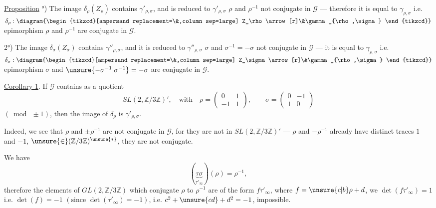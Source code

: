 
\uline{Proposition} °) The image $\delta_\rho(Z_\rho)$ contains
$\gamma'_{\rho,\sigma}$, and is
reduced to $\gamma'_{\rho,\sigma}$ 
$\rho$ and $\rho^{-1}$ not conjugate in $\mathcal{G}$ ---
therefore it is equal to $\gamma_{\rho,\sigma}$
i.e.
$\delta_\rho:\diagram{\begin{tikzcd}[ampersand replacement=\&,column sep=large]
Z_\rho\arrow[r]\&\gamma_{\rho,\sigma}
\end{tikzcd}}$
epimorphism  $\rho$ and $\rho^{-1}$ are conjugate in $\mathcal{G}$.

2°) The image $\delta_\sigma(Z_\sigma)$ contains
$\gamma''_{\rho,\sigma}$, and it is reduced to
$\gamma''_{\rho,\sigma}$  $\sigma$ and
$\sigma^{-1}=-\sigma$ not conjugate in $\mathcal{G}$ ---
 it is equal to $\gamma_{\rho,\sigma}$ i.e.
$\delta_\sigma:\diagram{\begin{tikzcd}[ampersand replacement=\&,column sep=large]
Z_\sigma\arrow[r]\&\gamma_{\rho,\sigma}
\end{tikzcd}}$
epimorphism  $\sigma$ and
$\unsure{-\sigma^{-1}|\sigma^{-1}}=-\sigma$ are conjugate in $\mathcal{G}$.

\uline{Corollary 1}. If $\mathcal{G}$ contains as a quotient
\[
SL(2,\mathbb{Z}/3\mathbb{Z})',\quad\text{with}\quad
\rho=\begin{pmatrix}0&1\\-1&1\end{pmatrix},\qquad
\sigma=\begin{pmatrix}0&-1\\1&0\end{pmatrix}
\]
$(\bmod\ \pm1)$, then the image of $\delta_\rho$ is
$\gamma'_{\rho,\sigma}$.

Indeed, we see that $\rho$ and $\pm\rho^{-1}$ are not
conjugate in $\mathcal{G}$, for they are
not in $SL(2,\mathbb{Z}/3\mathbb{Z})'$ ---
$\rho$ and $-\rho^{-1}$ already have distinct traces
$1$ and $-1$, $\unsure{\in}(\mathbb{Z}/3\mathbb{Z})^{\unsure{*}}$,
they are not conjugate.

We have
\[
(\underbrace{\tau\sigma}_{\tau'_\infty})(\rho)=\rho^{-1},
\]
therefore
 the elements of
$GL(2,\mathbb{Z}/3\mathbb{Z})$
which conjugate $\rho$ to $\rho^{-1}$ are of the form
$f\tau'_\infty$, where
$f=\unsure{c|b}\rho+d$, we 
$\det(f\tau'_\infty)=1$ i.e. $\det(f)=-1$
$(\text{since }\det(\tau'_\infty)=-1)$,
i.e. $c^2+\unsure{cd}+d^2=-1$, impossible.

